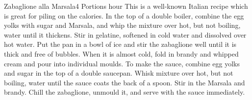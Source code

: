 \documentclass[letterpaper]{article}
\begin{document}
\begin{recipe}{Zabaglione alla Marsala}{4 Portions}{ hour}
  \freeform This is a well-known Italian recipe which is
  great for piling on the calories.
  In the top of a double boiler, combine the egg yolks with sugar and
  Marsala, and whip the mixture over hot, but not boiling, water until it
  thickens. Stir in gelatine, softened in cold water and dissolved over hot
  water.
  Put the pan in a bowl of ice and stir the
  zabaglione well until it is thick and free of bubbles.  When it is almost
  cold, fold in brandy and whipped cream and pour into individual moulds.
  To make the sauce, combine egg yolks and sugar in the top of a double
  saucepan.  Whisk mixture over hot, but not boiling, water until the
  sauce coats
  the back of a spoon.  Stir in the Marsala and brandy.
  \newstep
  Chill the zabaglione, unmould it, and serve with the sauce immediately.
  \end{recipe}
\end{document}
